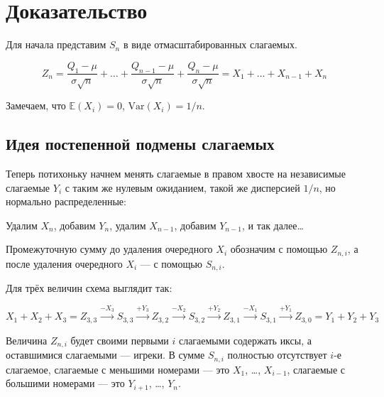 \documentclass[
  letterpaper,
  DIV=11,
  numbers=noendperiod]{scrartcl}
\newcommand\E{{\mathbb{E}}}
\newcommand\Var{{\mathrm{Var}}}
\begin{document}
\hypertarget{ux434ux43eux43aux430ux437ux430ux442ux435ux43bux44cux441ux442ux432ux43e}{%
\section{Доказательство}\label{ux434ux43eux43aux430ux437ux430ux442ux435ux43bux44cux441ux442ux432ux43e}}

Для начала представим \(S_n\) в виде отмасштабированных слагаемых.

\[
Z_n = \frac{Q_1 - \mu}{\sigma \sqrt n} + \ldots + \frac{Q_{n-1} - \mu}{\sigma \sqrt n} + \frac{Q_n - \mu}{\sigma \sqrt n} = X_1 + \ldots + X_{n-1} + X_n
\]

Замечаем, что \(\E(X_i) = 0\), \(\Var(X_i) = 1/n\).

\hypertarget{ux438ux434ux435ux44f-ux43fux43eux441ux442ux435ux43fux435ux43dux43dux43eux439-ux43fux43eux434ux43cux435ux43dux44b-ux441ux43bux430ux433ux430ux435ux43cux44bux445}{%
\subsection{Идея постепенной подмены
слагаемых}\label{ux438ux434ux435ux44f-ux43fux43eux441ux442ux435ux43fux435ux43dux43dux43eux439-ux43fux43eux434ux43cux435ux43dux44b-ux441ux43bux430ux433ux430ux435ux43cux44bux445}}

Теперь потихоньку начнем менять слагаемые в правом хвосте на независимые
слагаемые \(Y_i\) с таким же нулевым ожиданием, такой же дисперсией
\(1/n\), но нормально распределенные:

Удалим \(X_n\), добавим \(Y_n\), удалим \(X_{n-1}\), добавим
\(Y_{n-1}\), и так далее\ldots{}

Промежуточную сумму до удаления очередного \(X_i\) обозначим с помощью
\(Z_{n,i}\), а после удаления очередного \(X_i\) --- с помощью
\(S_{n,i}\).

Для трёх величин схема выглядит так:

\[
X_1 + X_2 + X_3 = Z_{3,3} \overset{-X_3}{\longrightarrow}S_{3,3}\overset{+Y_3}{\longrightarrow}Z_{3,2}\overset{-X_2}{\longrightarrow}S_{3,2}\overset{+Y_2}{\longrightarrow}Z_{3,1}\overset{-X_1}{\longrightarrow}S_{3,1}\overset{+Y_1}{\longrightarrow}Z_{3,0}=Y_1 + Y_2 + Y_3
\]

Величина \(Z_{n,i}\) будет своими первыми \(i\) слагаемыми содержать
иксы, а оставшимися слагаемыми --- игреки. В сумме \(S_{n,i}\) полностью
отсутствует \(i\)-е слагаемое, слагаемые с меньшими номерами --- это
\(X_1\), \ldots, \(X_{i-1}\), слагаемые с большими номерами --- это
\(Y_{i+1}\), \ldots, \(Y_n\).
\end{document}
